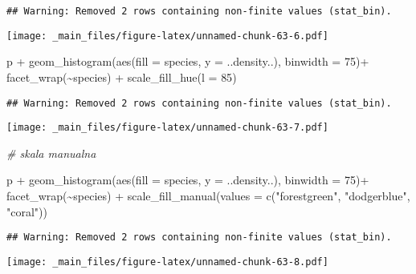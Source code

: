 \documentclass[
]{book}
\newenvironment{Shaded}{\begin{snugshade}}{\end{snugshade}}
\newcommand{\AttributeTok}[1]{\textcolor[rgb]{0.77,0.63,0.00}{#1}}
\newcommand{\CommentTok}[1]{\textcolor[rgb]{0.56,0.35,0.01}{\textit{#1}}}
\newcommand{\DecValTok}[1]{\textcolor[rgb]{0.00,0.00,0.81}{#1}}
\newcommand{\FunctionTok}[1]{\textcolor[rgb]{0.00,0.00,0.00}{#1}}
\newcommand{\NormalTok}[1]{#1}
\newcommand{\SpecialCharTok}[1]{\textcolor[rgb]{0.00,0.00,0.00}{#1}}
\newcommand{\StringTok}[1]{\textcolor[rgb]{0.31,0.60,0.02}{#1}}
\begin{document}
\begin{verbatim}
## Warning: Removed 2 rows containing non-finite values (stat_bin).
\end{verbatim}

\texttt{[image: \_main\_files/figure-latex/unnamed-chunk-63-6.pdf]}

\begin{Shaded}
\begin{Highlighting}[]
\NormalTok{p }\SpecialCharTok{+} \FunctionTok{geom\_histogram}\NormalTok{(}\FunctionTok{aes}\NormalTok{(}\AttributeTok{fill =}\NormalTok{ species, }\AttributeTok{y =}\NormalTok{ ..density..), }\AttributeTok{binwidth =} \DecValTok{75}\NormalTok{)}\SpecialCharTok{+}
  \FunctionTok{facet\_wrap}\NormalTok{(}\SpecialCharTok{\textasciitilde{}}\NormalTok{species) }\SpecialCharTok{+} \FunctionTok{scale\_fill\_hue}\NormalTok{(}\AttributeTok{l =} \DecValTok{85}\NormalTok{)}
\end{Highlighting}
\end{Shaded}

\begin{verbatim}
## Warning: Removed 2 rows containing non-finite values (stat_bin).
\end{verbatim}

\texttt{[image: \_main\_files/figure-latex/unnamed-chunk-63-7.pdf]}

\begin{Shaded}
\begin{Highlighting}[]
\CommentTok{\# skala manualna}

\NormalTok{p }\SpecialCharTok{+} \FunctionTok{geom\_histogram}\NormalTok{(}\FunctionTok{aes}\NormalTok{(}\AttributeTok{fill =}\NormalTok{ species, }\AttributeTok{y =}\NormalTok{ ..density..), }\AttributeTok{binwidth =} \DecValTok{75}\NormalTok{)}\SpecialCharTok{+}
  \FunctionTok{facet\_wrap}\NormalTok{(}\SpecialCharTok{\textasciitilde{}}\NormalTok{species) }\SpecialCharTok{+} \FunctionTok{scale\_fill\_manual}\NormalTok{(}\AttributeTok{values =} \FunctionTok{c}\NormalTok{(}\StringTok{"forestgreen"}\NormalTok{, }\StringTok{"dodgerblue"}\NormalTok{, }\StringTok{"coral"}\NormalTok{))}
\end{Highlighting}
\end{Shaded}

\begin{verbatim}
## Warning: Removed 2 rows containing non-finite values (stat_bin).
\end{verbatim}

\texttt{[image: \_main\_files/figure-latex/unnamed-chunk-63-8.pdf]}
\end{document}
